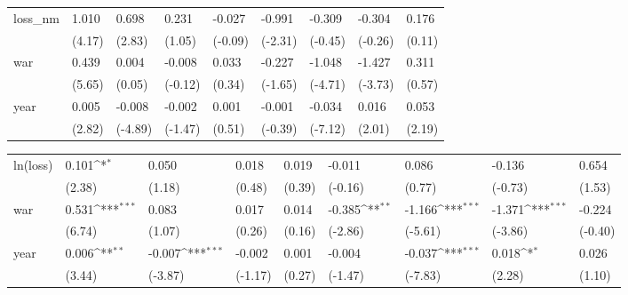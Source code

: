 \begin{tabular}{p{1.5cm} p{2cm} p{1.7cm} p{1.7cm} p{1.7cm} p{1.7cm} p{1.7cm} p{1.7cm} p{1.7cm}}
\hline
loss\_nm         &    1.010\sym{***}&    0.698\sym{**} &    0.231         &   -0.027         &   -0.991\sym{*}  &   -0.309         &   -0.304         &    0.176         \\
                &   (4.17)         &   (2.83)         &   (1.05)         &  (-0.09)         &  (-2.31)         &  (-0.45)         &  (-0.26)         &   (0.11)         \\
war             &    0.439\sym{***}&    0.004         &   -0.008         &    0.033         &   -0.227         &   -1.048\sym{***}&   -1.427\sym{***}&    0.311         \\
                &   (5.65)         &   (0.05)         &  (-0.12)         &   (0.34)         &  (-1.65)         &  (-4.71)         &  (-3.73)         &   (0.57)         \\
year            &    0.005\sym{**} &   -0.008\sym{***}&   -0.002         &    0.001         &   -0.001         &   -0.034\sym{***}&    0.016\sym{*}  &    0.053\sym{*}  \\
                &   (2.82)         &  (-4.89)         &  (-1.47)         &   (0.51)         &  (-0.39)         &  (-7.12)         &   (2.01)         &   (2.19)         \\
\end{tabular}
\def\sym#1{\ifmmode^{#1}\else\(^{#1}\)\fi}
\begin{tabular}{p{1.5cm} p{2cm} p{1.7cm} p{1.7cm} p{1.7cm} p{1.7cm} p{1.7cm} p{1.7cm} p{1.7cm}}
\hline
ln(loss)        &    0.101\sym{*}  &    0.050         &    0.018         &    0.019         &   -0.011         &    0.086         &   -0.136         &    0.654         \\
                &   (2.38)         &   (1.18)         &   (0.48)         &   (0.39)         &  (-0.16)         &   (0.77)         &  (-0.73)         &   (1.53)         \\
war             &    0.531\sym{***}&    0.083         &    0.017         &    0.014         &   -0.385\sym{**} &   -1.166\sym{***}&   -1.371\sym{***}&   -0.224         \\
                &   (6.74)         &   (1.07)         &   (0.26)         &   (0.16)         &  (-2.86)         &  (-5.61)         &  (-3.86)         &  (-0.40)         \\
year            &    0.006\sym{**} &   -0.007\sym{***}&   -0.002         &    0.001         &   -0.004         &   -0.037\sym{***}&    0.018\sym{*}  &    0.026         \\
                &   (3.44)         &  (-3.87)         &  (-1.17)         &   (0.27)         &  (-1.47)         &  (-7.83)         &   (2.28)         &   (1.10)         \\
\end{tabular}
